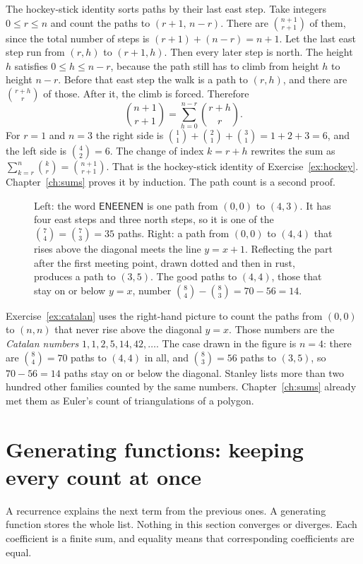 The hockey-stick identity sorts paths by their last east step. Take integers $0\le r\le n$ and count the paths to $(r+1,\,n-r)$. There are $\binom{n+1}{r+1}$ of them, since the total number of steps is $(r+1)+(n-r)=n+1$. Let the last east step run from $(r,h)$ to $(r+1,h)$. Then every later step is north. The height $h$ satisfies $0\le h\le n-r$, because the path still has to climb from height $h$ to height $n-r$. Before that east step the walk is a path to $(r,h)$, and there are $\binom{r+h}{r}$ of those. After it, the climb is forced. Therefore
\[
\binom{n+1}{r+1}=\sum_{h=0}^{n-r}\binom{r+h}{r}.
\]
For $r=1$ and $n=3$ the right side is $\binom11+\binom21+\binom31=1+2+3=6$, and the left side is $\binom42=6$. The change of index $k=r+h$ rewrites the sum as $\sum_{k=r}^{n}\binom kr=\binom{n+1}{r+1}$. That is the hockey-stick identity of Exercise~\ref{ex:hockey}. Chapter~\ref{ch:sums} proves it by induction. The path count is a second proof.

\begin{figure}[ht]
\centering
{}
\caption{Left: the word $\mathsf{ENEENEN}$ is one path from $(0,0)$ to $(4,3)$. It has four east steps and three north steps, so it is one of the $\binom74=\binom73=35$ paths. Right: a path from $(0,0)$ to $(4,4)$ that rises above the diagonal meets the line $y=x+1$. Reflecting the part after the first meeting point, drawn dotted and then in rust, produces a path to $(3,5)$. The good paths to $(4,4)$, those that stay on or below $y=x$, number $\binom84-\binom83=70-56=14$.}
\label{fig:paths}
\end{figure}

Exercise~\ref{ex:catalan} uses the right-hand picture to count the paths from $(0,0)$ to $(n,n)$ that never rise above the diagonal $y=x$. Those numbers are the \emph{Catalan numbers} $1,1,2,5,14,42,\dots$. The case drawn in the figure is $n=4$: there are $\binom84=70$ paths to $(4,4)$ in all, and $\binom83=56$ paths to $(3,5)$, so $70-56=14$ paths stay on or below the diagonal. Stanley lists more than two hundred other families counted by the same numbers. Chapter~\ref{ch:sums} already met them as Euler's count of triangulations of a polygon.

\section{Generating functions: keeping every count at once}
A recurrence explains the next term from the previous ones. A generating function stores the whole list. Nothing in this section converges or diverges. Each coefficient is a finite sum, and equality means that corresponding coefficients are equal.

